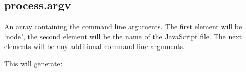 \begin{Shaded}
\begin{Highlighting}[]
\NormalTok{();}
\NormalTok{(}\NormalTok{);}

\NormalTok{(}\NormalTok{, }
  \NormalTok{(} 
\NormalTok{\});}

\NormalTok{(}\NormalTok{, }\NormalTok{() \{}
  \NormalTok{(}\NormalTok{);}
\NormalTok{\});}
\end{Highlighting}
\end{Shaded}

\subsection{process.argv}

An array containing the command line arguments. The first element will
be `node', the second element will be the name of the JavaScript file.
The next elements will be any additional command line arguments.

\begin{Shaded}
\begin{Highlighting}[]
\NormalTok{(}
   
\NormalTok{\});}
\end{Highlighting}
\end{Shaded}

This will generate:

\begin{Shaded}
\begin{Highlighting}[]
\NormalTok{: }\OtherTok{/}\OtherTok{/}
\end{Highlighting}
\end{Shaded}

